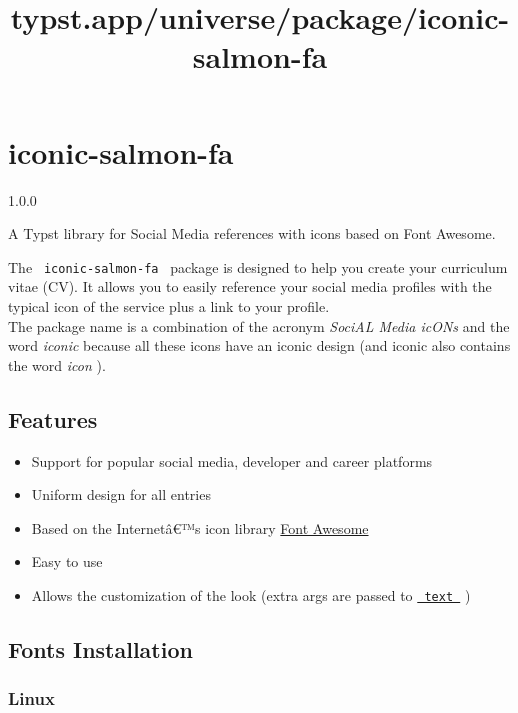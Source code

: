 \title{typst.app/universe/package/iconic-salmon-fa}

\label{banner}
\section{iconic-salmon-fa}\label{iconic-salmon-fa}

{ 1.0.0 }

A Typst library for Social Media references with icons based on Font
Awesome.

\label{readme}
The \texttt{\ iconic-salmon-fa\ } package is designed to help you create
your curriculum vitae (CV). It allows you to easily reference your
social media profiles with the typical icon of the service plus a link
to your profile.\\
The package name is a combination of the acronym \emph{SociAL Media
icONs} and the word \emph{iconic} because all these icons have an iconic
design (and iconic also contains the word \emph{icon} ).

\subsection{Features}\label{features}

\begin{itemize}
\tightlist
\item
  Support for popular social media, developer and career platforms
\item
  Uniform design for all entries
\item
  Based on the Internetâ€™s icon library
  \href{https://fontawesome.com/}{Font Awesome}
\item
  Easy to use
\item
  Allows the customization of the look (extra args are passed to
  \href{https://typst.app/docs/reference/text/text/}{\texttt{\ text\ }}
  )
\end{itemize}

\subsection{Fonts Installation}\label{fonts-installation}

\subsubsection{Linux}\label{linux}

